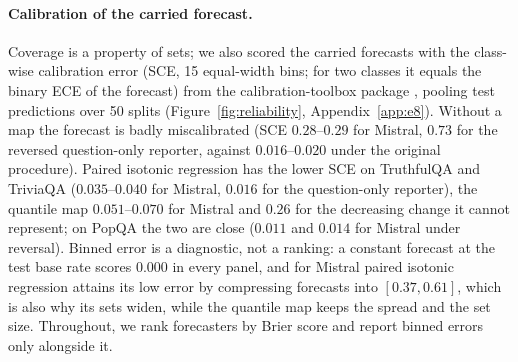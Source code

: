 \documentclass[twoside]{article}
\theoremstyle{definition}
\theoremstyle{remark}
\newcommand{\1}{\mathbf{1}}
\begin{document}
\paragraph{Calibration of the carried forecast.} Coverage
is a property of sets; we also scored the carried forecasts with the class-wise calibration error
(SCE, 15 equal-width bins; for two classes it equals the binary ECE of the forecast) from the
calibration-toolbox package \citep{pearce2026calibrationtoolbox}, pooling test predictions over 50
splits (Figure~\ref{fig:reliability}, Appendix~\ref{app:e8}). Without a map the forecast is badly
miscalibrated (SCE $0.28$--$0.29$ for Mistral, $0.73$ for the reversed question-only reporter, against
$0.016$--$0.020$ under the original procedure). Paired isotonic regression has the lower SCE on TruthfulQA
and TriviaQA ($0.035$--$0.040$ for Mistral, $0.016$ for the question-only reporter), the quantile map
$0.051$--$0.070$ for Mistral and $0.26$ for the decreasing change it cannot represent; on PopQA the two are
close ($0.011$ and $0.014$ for Mistral under reversal). Binned error is a diagnostic, not a ranking: a
constant forecast at the test base rate scores $0.000$ in every panel, and for Mistral paired isotonic
regression attains its low error by compressing forecasts into $[0.37,0.61]$, which is also why its sets
widen, while the quantile map keeps the spread and the set size. Throughout, we rank forecasters by Brier
score and report binned errors only alongside it.
\end{document}
